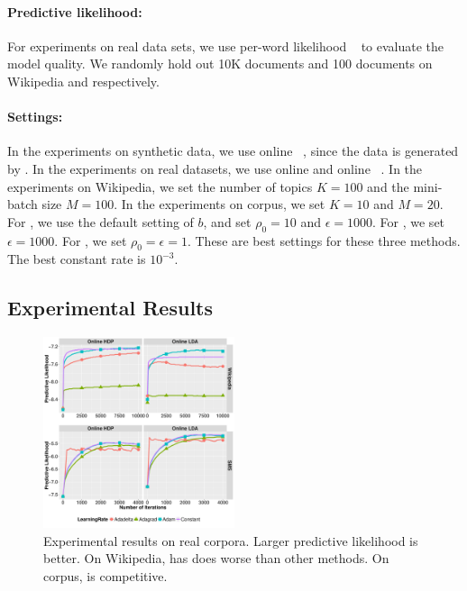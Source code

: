 \paragraph{Predictive likelihood:} For experiments on real data sets, we use
per-word likelihood ~\cite{hoffman2013stochastic} to evaluate the model
quality. We randomly hold out 10K documents and 100 documents on
Wikipedia and  respectively.

\paragraph{Settings:} In the experiments on synthetic data, we use online ~\cite{hoffman2010online}, since the data is generated by . In the experiments on real datasets, we use online  and online ~\cite{wang2011online}. In the experiments on Wikipedia, we set the number of topics $K=100$ and
the mini-batch size $M=100$.
In the experiments on  corpus, we set $K=10$ and $M=20$.
For , we use the default setting of $b$, and set $\rho_0 = 10$ and
$\epsilon = 1000$. For , we set $\epsilon = 1000$. For
, we set $\rho_0 = \epsilon = 1$. These are best settings for
these three methods. The best constant rate is $10^{-3}$.

\subsection{Experimental Results}

\begin{figure}[t]	\centering
			\includegraphics[width= 0.5\textwidth]{2017_emnlp_adagrad_olda/figures/Likelihood.pdf}
		\caption{Experimental results on real corpora. Larger predictive
likelihood is better. On Wikipedia,  has does worse than other
methods. On  corpus,  is competitive.}
	\label{fig:likelihood}       \end{figure}



